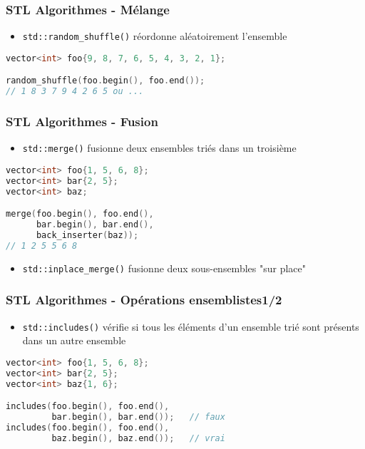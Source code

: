 \documentclass[C++.tex]{subfiles}
\begin{document}
\begin{frame}[fragile]
	\frametitle{STL Algorithmes - Mélange}
	\begin{itemize}
		\item \lstinline|std::random_shuffle()| réordonne aléatoirement l'ensemble
	\end{itemize}

	\begin{lstlisting}[language=C++]
vector<int> foo{9, 8, 7, 6, 5, 4, 3, 2, 1};

random_shuffle(foo.begin(), foo.end());
// 1 8 3 7 9 4 2 6 5 ou ...\end{lstlisting}
\end{frame}

\begin{frame}[fragile]
	\frametitle{STL Algorithmes - Fusion}
	\begin{itemize}
		\item \lstinline|std::merge()| fusionne deux ensembles triés dans un troisième
	\end{itemize}


	\begin{lstlisting}[language=C++]
vector<int> foo{1, 5, 6, 8};
vector<int> bar{2, 5};
vector<int> baz;

merge(foo.begin(), foo.end(), 
      bar.begin(), bar.end(), 
      back_inserter(baz));
// 1 2 5 5 6 8\end{lstlisting}

	\begin{itemize}
		\item \lstinline|std::inplace_merge()| fusionne deux sous-ensembles "sur place"
	\end{itemize}

\end{frame}

\begin{frame}[fragile]
	\frametitle{STL Algorithmes - Opérations ensemblistes\titlehfill{}1/2}
	\begin{itemize}
		\item \lstinline|std::includes()| vérifie si tous les éléments d'un ensemble trié sont présents dans un autre ensemble

	\end{itemize}

	\begin{lstlisting}[language=C++]
vector<int> foo{1, 5, 6, 8};
vector<int> bar{2, 5};
vector<int> baz{1, 6};

includes(foo.begin(), foo.end(), 
         bar.begin(), bar.end());   // faux
includes(foo.begin(), foo.end(), 
         baz.begin(), baz.end());   // vrai\end{lstlisting}
\end{frame}
\end{document}
